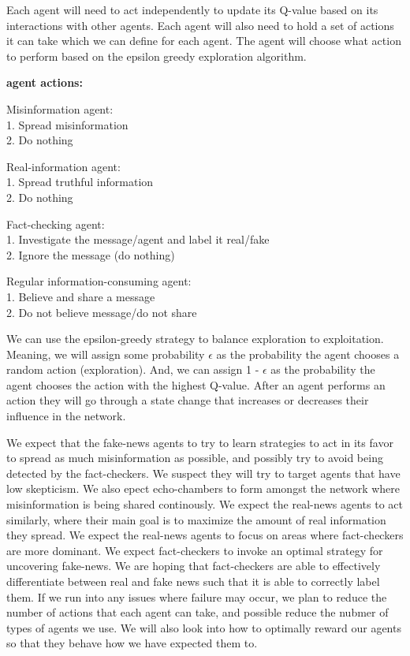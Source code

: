 \documentclass[12pt,twoside]{article}
\begin{document}
Each agent will need to act independently to update its Q-value based on its interactions with other agents. Each agent will also need to hold a set of actions it can take which we can define for each agent. The agent will choose what action to perform based on the epsilon greedy exploration algorithm. 

\textbf{agent actions:}

Misinformation agent:\\
1. Spread misinformation\\
2. Do nothing

Real-information agent:\\
1. Spread truthful information\\
2. Do nothing

Fact-checking agent:\\
1. Investigate the message/agent and label it real/fake\\
2. Ignore the message (do nothing)

Regular information-consuming agent:\\
1. Believe and share a message\\
2. Do not believe message/do not share

We can use the epsilon-greedy strategy to balance exploration to exploitation. Meaning, we will assign some probability 
$\epsilon$
 as the probability the agent chooses a random action (exploration). And, we can assign 1 - $\epsilon$
 as the probability the agent chooses the action with the highest Q-value. After an agent performs an action they will go through a state change that increases or decreases their influence in the network.

We expect that the fake-news agents to try to learn strategies to act in its favor to spread as much misinformation as possible, and possibly try to avoid being detected by the fact-checkers. We suspect they will try to target agents that have low skepticism. We also epect echo-chambers to form amongst the network where misinformation is being shared continously. We expect the real-news agents to act similarly, where their main goal is to maximize the amount of real information they spread. We expect the real-news agents to focus on areas where fact-checkers are more dominant. We expect fact-checkers to invoke an optimal strategy for uncovering fake-news. We are hoping that fact-checkers are able to effectively differentiate between real and fake news such that it is able to correctly label them. If we run into any issues where failure may occur, we plan to reduce the number of actions that each agent can take, and possible reduce the nubmer of types of agents we use. We will also look into how to optimally reward our agents so that they behave how we have expected them to.
\end{document}

